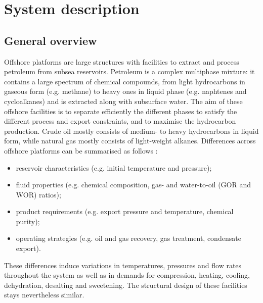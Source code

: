 \documentclass[times,3p]{elsarticle}
\begin{document}
\section{System description}
\label{sec:system_description}

\subsection{General overview}
\label{subsec:overview}

Offshore platforms are large structures with facilities to extract and process petroleum from subsea reservoirs. Petroleum is a complex multiphase mixture: it contains a large spectrum of chemical compounds, from light hydrocarbons in gaseous form (e.g. methane) to heavy ones in liquid phase (e.g. naphtenes and cycloalkanes) and is extracted along with subsurface water. The aim of these offshore facilities is to separate efficiently the different phases to satisfy the different process and export constraints, and to maximise the hydrocarbon production. Crude oil mostly consists of medium- to heavy hydrocarbons in liquid form, while natural gas mostly consists of light-weight alkanes. Differences across offshore platforms can be summarised as follows \cite{Bothamley2004,Energistyrelsen2011,NorwegianMinistryofPetroleumandEnergy2012,JonesDavidS.J.Stan;Pujado2006,Manning1991,Plisga2004,Abdel-AalH.K.;AggourMohamed;Fahim2003,VikEilanArctander;Dinning2009}: 

\begin{itemize}
	\item reservoir characteristics (e.g. initial temperature and pressure);
	\item fluid properties (e.g. chemical composition, gas- and water-to-oil (GOR and WOR) ratios);
	\item product requirements (e.g. export pressure and temperature, chemical purity);
	\item operating strategies (e.g. oil and gas recovery, gas treatment, condensate export).
\end{itemize}

These differences induce variations in temperatures, pressures and flow rates throughout the system as well as in demands for compression, heating, cooling, dehydration, desalting and sweetening. The structural design of these facilities stays nevertheless similar. 
\end{document}
